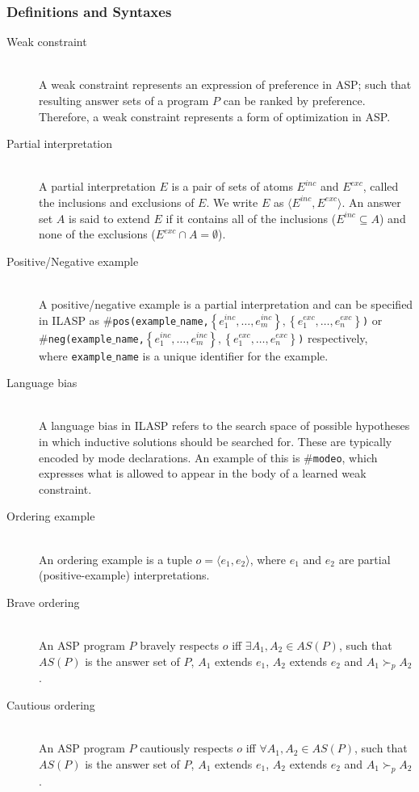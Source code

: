 \subsubsection{Definitions and Syntaxes}

\begin{description}
    \item [Weak constraint] \hfill \\
    A weak constraint represents an expression of preference in ASP; such that resulting answer sets of a program $P$ can be ranked by preference. Therefore, a weak constraint represents a form of optimization in ASP.
    \item [Partial interpretation] \hfill \\
    A partial interpretation $E$ is a pair of sets of atoms $E^{inc}$ and $E^{exc}$, called the inclusions and exclusions of $E$. We write $E$ as $\langle E^{inc},E^{exc} \rangle$. An answer set $A$ is said to extend $E$ if it contains all of the inclusions ($E^{inc} \subseteq A$) and none of the exclusions ($E^{exc} \cap A = \emptyset$).
    \item [Positive/Negative example] \hfill \\ A positive/negative example is a partial interpretation and can be specified in ILASP as
    \texttt{$\#$pos(example$\_$name,$\left\{e_1^{inc},\ldots,e_m^{inc}\right\},\left\{e_1^{exc},\ldots,e_n^{exc}\right\}$)} or \\
    \texttt{$\#$neg(example$\_$name,$\left\{e_1^{inc},\ldots,e_m^{inc}\right\},\left\{e_1^{exc},\ldots,e_n^{exc}\right\}$)} respectively, \\where \texttt{example$\_$name} is a unique identifier for the example.
    \item [Language bias] \hfill \\
    A language bias in ILASP refers to the search space of possible hypotheses in which inductive solutions should be searched for. These are typically encoded by mode declarations. An example of this is \texttt{$\#$modeo}, which expresses what is allowed to appear in the body of a learned weak constraint.
    \item [Ordering example] \hfill \\ An ordering example is a tuple $o = \langle e_1,e_2 \rangle$, where $e_1$ and $e_2$ are partial (positive-example) interpretations.
    \item [Brave ordering\footnotemark] \hfill \\
    An ASP program $P$ bravely respects $o$ iff $\exists A_1,A_2 \in AS(P)$, such that $AS(P)$ is the answer set of $P$, $A_1$ extends $e_1$, $A_2$ extends $e_2$ and $A_1 \succ_p A_2$.
    \item [Cautious ordering\text{\footnotemark[\value{footnote}]}] \hfill \\
    An ASP program $P$ cautiously respects $o$ iff $\forall A_1,A_2 \in AS(P)$, such that $AS(P)$ is the answer set of $P$, $A_1$ extends $e_1$, $A_2$ extends $e_2$ and $A_1 \succ_p A_2$.
\end{description}


